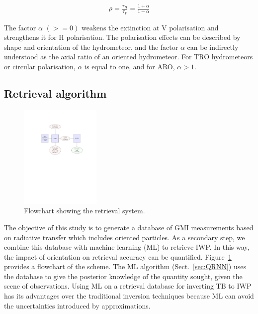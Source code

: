\documentclass[amt, manuscript]{copernicus}
\begin{document}
\begin{eqnarray}
\rho = \frac{\tau_H}{\tau_V} = \frac{1+\alpha}{1-\alpha}
\end{eqnarray}

The factor $\alpha$ $(>= 0)$  weakens the extinction at V polarisation and strengthens it for H polarisation. The polarisation effects can be described by shape and orientation of the hydrometeor, and the factor $\alpha$ can be indirectly understood as the axial ratio of an oriented hydrometeor. For TRO hydrometeors or circular polarisation, $\alpha$ is equal to one, and for ARO, $\alpha > 1$. 


\subsection{Retrieval algorithm}
\label{sec:retrieval_algo}

\begin{figure}[t]
	\includegraphics[trim=100 410 100 125,clip,height = 50mm, ]{Figures/flowchart.pdf}
	\caption{Flowchart showing the retrieval system.}
	\label{fig:flowchart}
\end{figure}

The objective of this study is to generate a database of GMI measurements based on radiative transfer which includes oriented particles. As a secondary step, we combine this database with machine learning (ML) to retrieve IWP. In this way, the impact of orientation on retrieval accuracy can be quantified. Figure~\ref{fig:flowchart} provides a flowchart of the scheme. The ML algorithm (Sect.~\ref{sec:QRNN}) uses the database to give the posterior knowledge of the quantity sought, given the scene of observations. Using ML on a retrieval database for inverting TB to IWP has its  advantages over the traditional inversion techniques because ML can avoid the uncertainties introduced by approximations. 
\end{document}
